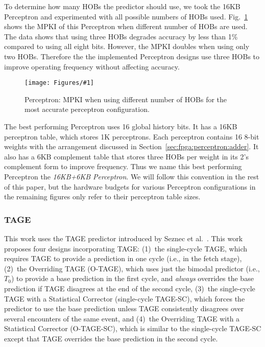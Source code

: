 \documentclass[conference]{IEEEtran}
\newcommand{\kfig}[4]{ %
        \begin{figure}[!t]
        \centering
        \texttt{[image: Figures/\#1]}
        \vspace{-1mm}
        \caption{#3}
        \label{#2}
        \end{figure}
}
\begin{document}
To determine how many HOBs the predictor should use, we took the 16KB Perceptron and experimented with all possible numbers of HOBs used. Fig.~\ref{fig:perceptronHOB} shows the MPKI of this Perceptron when different number of HOBs are used. The data shows that using three HOBs degrades accuracy by less than 1\% compared to using all eight bits. However, the MPKI doubles when using only two HOBs. Therefore the the implemented Perceptron designs use three HOBs to improve operating frequency without affecting accuracy.
\kfig{perceptronHOB.pdf}{fig:perceptronHOB}{Perceptron: MPKI when using different number of HOBs for the most accurate perceptron configuration.}{angle = 0, trim = 1in 2.6in 1in 2.6in, clip, width=0.35\textwidth}

The best performing Perceptron uses 16 global history bits. It has a 16KB perceptron table, which stores 1K perceptrons. Each perceptron contains 16 8-bit weights with the arrangement discussed in Section~\ref{sec:fpga:perceptron:adder}. It also has a 6KB complement table that stores three HOBs per weight in its 2's complement form to improve frequency. Thus we name this best performing Perceptron the \textit{16KB+6KB Perceptron}. We will follow this convention in the rest of this paper, but the hardware budgets for various Perceptron configurations in the remaining figures only refer to their perceptron table sizes.

\subsubsection{TAGE}
\label{sec:eval:accuracy:tage}
This work uses the TAGE predictor introduced by Seznec et al.~\cite{tage}.  This work proposes four designs incorporating TAGE:  (1)~the single-cycle TAGE, which requires TAGE to provide a prediction in one cycle (i.e., in the fetch stage), (2)~the Overriding TAGE (\mbox{O-TAGE}), which uses just the bimodal predictor (i.e., $T_0$) to provide a base prediction in the first cycle, and \textit{always} overrides the base prediction if TAGE disagrees at the end of the second cycle, (3)~the single-cycle TAGE with a Statistical Corrector (single-cycle \mbox{TAGE-SC}), which forces the predictor to use the base prediction unless TAGE consistently disagrees over several encounters of the same event, and (4)~the Overriding TAGE with a Statistical Corrector (\mbox{O-TAGE-SC}), which is similar to the single-cycle \mbox{TAGE-SC} except that TAGE overrides the base prediction in the second cycle.
\end{document}
